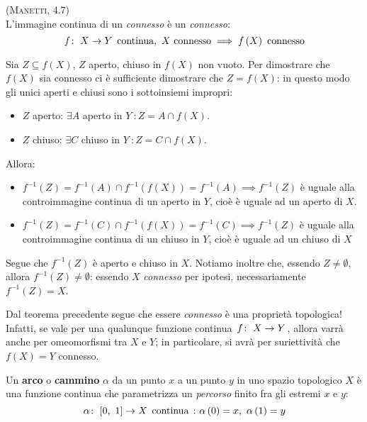 \begin{theorema}\textsc{(Manetti, 4.7)}\\
	L'immagine continua di un \textit{connesso} è un \textit{connesso}:
	\begin{equation}
		\funz{f}{X}{Y}\text{ continua},\ X\text{ connesso}\implies f\left(X\right)\text{ connesso}
	\end{equation}
\end{theorema}
\begin{theorema}
	Sia $Z\subseteq f\left(X\right)$, $Z$ aperto, chiuso in $f\left(X\right)$ non vuoto. Per dimostrare che $f\left(X\right)$ sia connesso ci è sufficiente dimostrare che $Z=f\left(X\right)$: in questo modo gli unici aperti e chiusi sono i sottoinsiemi impropri:
	\begin{itemize}
		\item $Z$ aperto: $\exists A$ aperto in $Y\ \colon Z=A\cap f\left(X\right)$.
		\item $Z$ chiuso: $\exists C$ chiuso in $Y\ \colon Z=C\cap f\left(X\right)$.
	\end{itemize}
	Allora:
	\begin{itemize}
		\item $f^{-1}\left(Z\right)=f^{-1}\left(A\right)\cap f^{-1}\left(f\left(X\right)\right)=f^{-1}\left(A\right)\implies f^{-1}\left(Z\right)$ è uguale alla controimmagine continua di un aperto in $Y$, cioè è uguale ad un aperto di $X$.
		\item $f^{-1}\left(Z\right)=f^{-1}\left(C\right)\cap f^{-1}\left(f\left(X\right)\right)=f^{-1}\left(C\right)\implies f^{-1}\left(Z\right)$ è uguale alla controimmagine continua di un chiuso in $Y$, cioè è uguale ad un chiuso di $X$
	\end{itemize}
	Segue che $f^{-1}\left(Z\right)$ è aperto e chiuso in $X$. Notiamo inoltre che, essendo $Z\neq \emptyset$, allora $f^{-1}\left(Z\right)\neq \emptyset$: essendo $X$ \textit{connesso} per ipotesi, necessariamente $f^{-1}\left(Z\right)=X$.
\end{theorema}
\begin{observe}
	Dal teorema precedente segue che essere \textit{connesso} è una proprietà topologica! Infatti, se vale per una qualunque funzione continua $\funz{f}{X}{Y}$, allora varrà anche per omeomorfismi tra $X$ e $Y$; in particolare, si avrà per suriettività che $f\left(X\right)=Y$ connesso.
\end{observe}
\begin{define}
	Un \textbf{arco} o \textbf{cammino} $\alpha$ da un punto $x$ a un punto $y$ in uno spazio topologico $X$ è una funzione continua che parametrizza un \textit{percorso} finito fra gli estremi $x$ e $y$:
	\begin{equation}
		\funz{\alpha}{\left[0,\ 1\right]}{X} \text{ continua}\ \colon \alpha\left(0\right)=x,\ \alpha\left(1\right)=y
	\end{equation}
\end{define}
